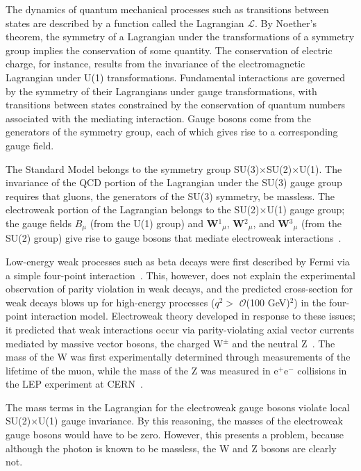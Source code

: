 The dynamics of quantum mechanical processes such as transitions between states are described by a function called the Lagrangian $\mathcal{L}$. By Noether's theorem, the symmetry of a Lagrangian under the transformations of a symmetry group implies the conservation of some quantity. The conservation of electric charge, for instance, results from the invariance of the electromagnetic Lagrangian under U(1) transformations. Fundamental interactions are governed by the symmetry of their Lagrangians under gauge transformations, with transitions between states constrained by the conservation of quantum numbers associated with the mediating interaction. Gauge bosons come from the generators of the symmetry group, each of which gives rise to a corresponding gauge field.

The Standard Model belongs to the symmetry group SU(3)$\times$SU(2)$\times$U(1). The invariance of the QCD portion of the Lagrangian under the SU(3) gauge group requires that gluons, the generators of the SU(3) symmetry, be massless. The electroweak portion of the Lagrangian belongs to the SU(2)$\times$U(1) gauge group; the gauge fields $B_{\mu}$ (from the U(1) group) and \textbf{W}$^1$$_{\mu}$, \textbf{W}$^2$$_{\mu}$, and \textbf{W}$^3$$_{\mu}$ (from the SU(2) group) give rise to gauge bosons that mediate electroweak interactions~\cite{Bednyakov:2007pz}.

Low-energy weak processes such as beta decays were first described by Fermi via a simple four-point interaction~\cite{0034-4885-42-12-001}. This, however, does not explain the experimental observation of parity violation in weak decays, and the predicted cross-section for weak decays blows up for high-energy processes ($q^2 >$ $\mathcal{O}$(100 GeV)$^2$) in the four-point interaction model. Electroweak theory developed in response to these issues; it predicted that weak interactions occur via parity-violating axial vector currents mediated by massive vector bosons, the charged W$^{\pm}$ and the neutral Z~\cite{PerkinsPhysics}. The mass of the W was first experimentally determined through measurements of the lifetime of the muon, while the mass of the Z was measured in e$^{+}$e$^{-}$ collisions in the LEP experiment at CERN~\cite{ThomsonPhysics}.

The mass terms in the Lagrangian for the electroweak gauge bosons violate local SU(2)$\times$U(1) gauge invariance. By this reasoning, the masses of the electroweak gauge bosons would have to be zero. However, this presents a problem, because although the photon is known to be massless, the W and Z bosons are clearly not.

